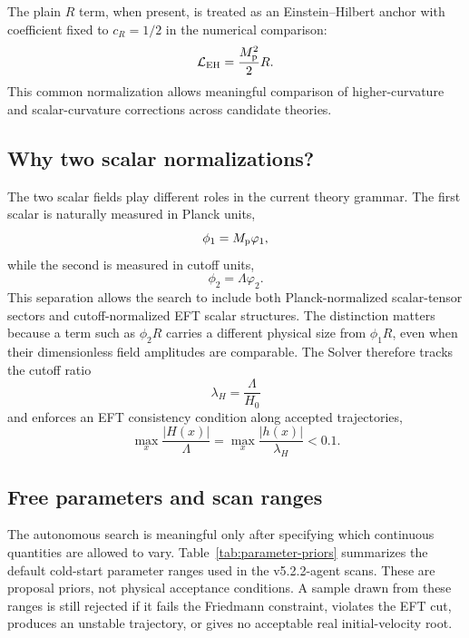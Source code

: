 \documentclass[aps,prd,twocolumn,superscriptaddress,nofootinbib,longbibliography]{revtex4-2}
\newcommand{\Lag}{\mathcal{L}}
\newcommand{\Mp}{M_{\rm p}}
\newcommand{\Lam}{\Lambda}
\newcommand{\varphione}{\varphi_1}
\newcommand{\varphitwo}{\varphi_2}
\begin{document}
The plain $R$ term, when present, is treated as an Einstein--Hilbert anchor with coefficient fixed to $c_R=1/2$ in the numerical comparison:
\begin{equation}
\Lag_{\rm EH}=\frac{\Mp^2}{2}R.
\label{eq:EH}
\end{equation}
This common normalization allows meaningful comparison of higher-curvature and scalar-curvature corrections across candidate theories.

\subsection{Why two scalar normalizations?}
\label{subsec:two-scalars}

The two scalar fields play different roles in the current theory grammar.  The first scalar is naturally measured in Planck units,
\begin{equation}
\phi_1=\Mp\varphione,
\end{equation}
while the second is measured in cutoff units,
\begin{equation}
\phi_2=\Lam\varphitwo .
\end{equation}
This separation allows the search to include both Planck-normalized scalar-tensor sectors and cutoff-normalized EFT scalar structures.  The distinction matters because a term such as $\phi_2 R$ carries a different physical size from $\phi_1 R$, even when their dimensionless field amplitudes are comparable.  The Solver therefore tracks the cutoff ratio
\begin{equation}
\lambda_H=\frac{\Lam}{H_0}
\end{equation}
and enforces an EFT consistency condition along accepted trajectories,
\begin{equation}
\max_x\frac{|H(x)|}{\Lam}=\max_x\frac{|h(x)|}{\lambda_H}<0.1.
\label{eq:eft-cut}
\end{equation}

\subsection{Free parameters and scan ranges}
\label{subsec:parameter-priors}

The autonomous search is meaningful only after specifying which continuous quantities are allowed to vary.  Table~\ref{tab:parameter-priors} summarizes the default cold-start parameter ranges used in the v5.2.2-agent scans.  These are proposal priors, not physical acceptance conditions.  A sample drawn from these ranges is still rejected if it fails the Friedmann constraint, violates the EFT cut, produces an unstable trajectory, or gives no acceptable real initial-velocity root.
\end{document}
